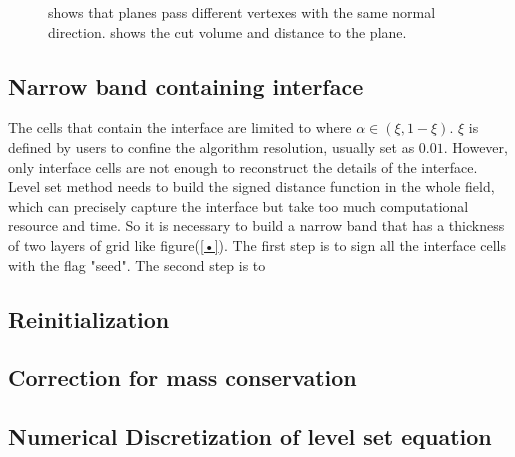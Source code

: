 \begin{figure}[htbp]
\centering
{}
\quad
{}
\caption{ shows that planes pass different vertexes with the same normal direction.  shows the cut volume and distance to the plane.}
\label{fig:multi}
\end{figure}

\subsection{Narrow band containing interface}
The cells that contain the interface are limited to where $\alpha\in(\xi,1-\xi)$. $\xi$ is defined by users to confine the algorithm resolution, usually set as $0.01$. However, only interface cells are not enough to reconstruct the details of the interface. Level set method needs to build the signed distance function in the whole field, which can precisely capture the interface but take too much computational resource and time. So it is necessary to build a narrow band that has a thickness of two layers of grid like figure(\ref{•}). The first step is to sign all the interface cells with the flag "seed". The second step is to 

\subsection{Reinitialization}

\subsection{Correction for mass conservation}

\subsection{Numerical Discretization of level set equation}

